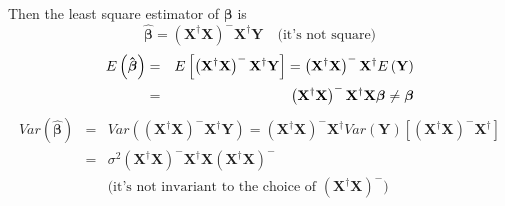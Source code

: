 \documentclass{article}
\begin{document}
Then the least square estimator of $\mathbf{\beta }$ is%
\begin{equation*}
\mathbf{\hat{\beta}}=\left( \mathbf{X}^{\dagger }\mathbf{X}\right) ^{-}%
\mathbf{X}^{\dagger }\mathbf{Y\quad }\text{(it's not square)}
\end{equation*}%
\begin{eqnarray*}
E\left( \mathbf{\hat{\beta}}\right) &=&E\left[ \left( \mathbf{X}^{\dagger }%
\mathbf{X}\right) ^{-}\mathbf{X}^{\dagger }\mathbf{Y}\right] =\left( \mathbf{%
X}^{\dagger }\mathbf{X}\right) ^{-}\mathbf{X}^{\dagger }E\left( \mathbf{Y}%
\right) \\
&=&\left( \mathbf{X}^{\dagger }\mathbf{X}\right) ^{-}\mathbf{X}^{\dagger }%
\mathbf{X\beta \neq \beta }
\end{eqnarray*}%
\begin{eqnarray*}
Var\left( \mathbf{\hat{\beta}}\right) &=&Var\left( \left( \mathbf{X}%
^{\dagger }\mathbf{X}\right) ^{-}\mathbf{X}^{\dagger }\mathbf{Y}\right)
=\left( \mathbf{X}^{\dagger }\mathbf{X}\right) ^{-}\mathbf{X}^{\dagger
}Var\left( \mathbf{Y}\right) \left[ \left( \mathbf{X}^{\dagger }\mathbf{X}%
\right) ^{-}\mathbf{X}^{\dagger }\right] \\
&=&\sigma ^{2}\left( \mathbf{X}^{\dagger }\mathbf{X}\right) ^{-}\mathbf{X}%
^{\dagger }\mathbf{X}\left( \mathbf{X}^{\dagger }\mathbf{X}\right) ^{-} \\
&&\text{(it's not invariant to the choice of }\left( \mathbf{X}^{\dagger }%
\mathbf{X}\right) ^{-}\text{)}
\end{eqnarray*}

\bigskip
\end{document}

